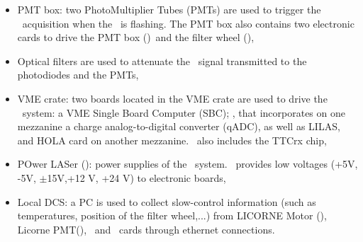 \begin{itemize}
\item PMT box: two PhotoMultiplier Tubes (PMTs) are used to trigger the \lasii~acquisition when the \laser~is flashing. The PMT box also contains two electronic cards to drive the PMT box (\licpmt)~and the filter wheel (\licmot),

\item Optical filters are used to attenuate the \laser~signal transmitted to the photodiodes and the PMTs,

\item VME crate: two boards located in the VME crate are used to drive the \lasii~system: a VME Single Board Computer (SBC); \lascar, that incorporates on one mezzanine a charge analog-to-digital converter (qADC), as well as LILAS, and HOLA card on another mezzanine. \lascar~also includes the TTCrx chip,

\item POwer LASer (\polas): power supplies of the \lasii~system. \polas~provides low voltages (+5V, -5V, $\pm$15V,+12 V, +24 V) to electronic boards,

\item Local DCS: a PC is used to collect slow-control information (such as temperatures, position of the filter wheel,...) from LICORNE Motor (\licmot), Licorne PMT(\licpmt), \licphd~and \lascar~cards through ethernet connections.


\end{itemize}